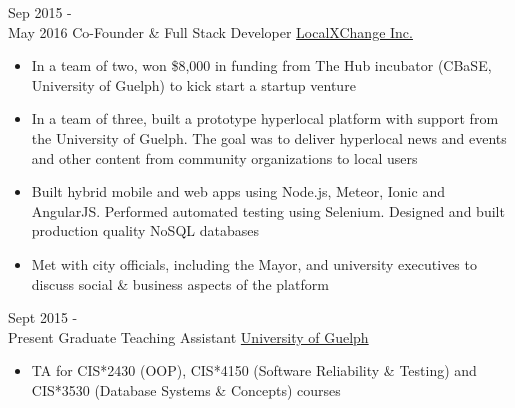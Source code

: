 \documentclass[letterpaper]{twentysecondcv} %
\begin{document}
\begin{twenty} %
	\twentyitem
    	{Sep 2015 - \\May 2016}
        {Co-Founder \& Full Stack Developer}
        {\href{http://www.localxchange.ca/}{LocalXChange Inc.}}
        {}
        {
        {\begin{itemize}
        \item In a team of two, won \$8,000 in funding from The Hub incubator (CBaSE, University of Guelph) to kick start a startup venture
        \item In a team of three, built a prototype hyperlocal platform with support from the University of Guelph. The goal was to deliver hyperlocal news and events and other content from community organizations to local users
        \item Built hybrid mobile and web apps using Node.js, Meteor, Ionic and AngularJS. Performed automated testing using Selenium. Designed and built production quality NoSQL databases
        \item Met with city officials, including the Mayor, and university executives to discuss social \& business aspects of the platform 
    \end{itemize}}
        }
        
    \twentyitem
   		{Sept 2015 - \\ Present}
        {Graduate Teaching Assistant}
        {\href{http://www.uoguelph.ca}{University of Guelph}}
        {}
        {
        {\begin{itemize}
        \item TA for CIS*2430 (OOP), CIS*4150 (Software Reliability \& Testing) and CIS*3530 (Database Systems \& Concepts) courses
    \end{itemize}}
        }
        

\end{twenty}
\end{document}
